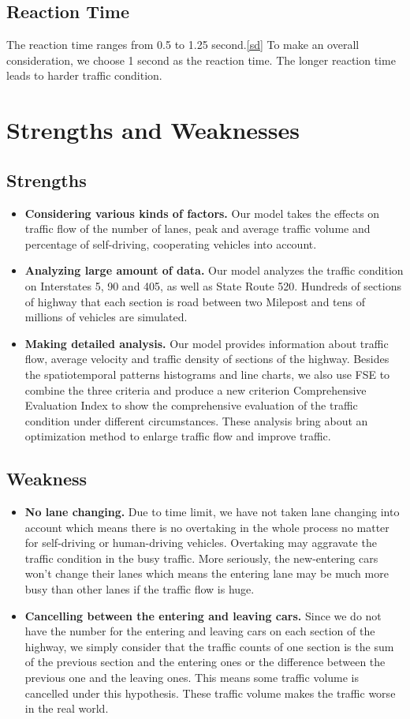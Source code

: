 \documentclass[a4paper]{article}
\begin{document}
	\subsection{Reaction Time}
	The reaction time ranges from 0.5 to 1.25 second.\ref{sd} To make an overall consideration, we choose 1 second as the reaction time. The longer reaction time leads to harder traffic condition.
	\section{Strengths and Weaknesses}
	\subsection{Strengths}
	\begin{itemize}
		\item \textbf{Considering various kinds of factors. }Our model takes the effects on traffic flow of the number of lanes, peak and average traffic volume and percentage of self-driving, cooperating vehicles into account.
		\item \textbf{Analyzing large amount of data. }Our model analyzes the traffic condition on Interstates 5, 90 and 405, as well as State Route 520. Hundreds of sections of highway that each section is road between two Milepost and tens of millions of vehicles are simulated.
		\item \textbf{Making detailed analysis. }Our model provides information about traffic flow, average velocity and traffic density of sections of the highway. Besides the spatiotemporal patterns histograms and line charts, we also use FSE to combine the three criteria and produce a new criterion Comprehensive Evaluation Index to show the comprehensive evaluation of the traffic condition under different circumstances. These analysis bring about an optimization method to enlarge traffic flow and improve traffic.
	\end{itemize}
	\subsection{Weakness}
	\begin{itemize}
		\item \textbf{No lane changing.} Due to time limit, we have not taken lane changing into account which means there is no overtaking in the whole process no matter for self-driving or human-driving vehicles. Overtaking may aggravate the traffic condition in the busy traffic. More seriously, the new-entering cars won't change their lanes which means the entering lane may be much more busy than other lanes if the traffic flow is huge. 
		\item \textbf{Cancelling between the entering and leaving cars.} Since we do not have the number for the entering and leaving cars on each section of the highway, we simply consider that the traffic counts of one section is the sum of the previous section and the entering ones or the difference between the previous one and the leaving ones. This means some traffic volume is cancelled under this hypothesis. These traffic volume makes the traffic worse in the real world.
	\end{itemize}
	
\end{document}
